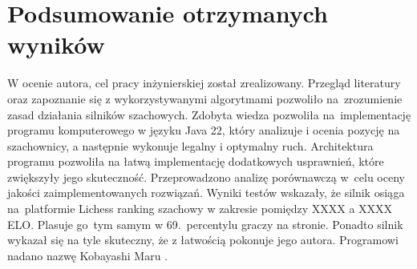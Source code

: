 \section {Podsumowanie otrzymanych wyników}
\label {sec: podsumowanie-pracy}

W ocenie autora, cel pracy inżynierskiej został zrealizowany.
Przegląd literatury oraz zapoznanie się z wykorzystywanymi algorytmami pozwoliło na~zrozumienie zasad działania silników szachowych.
Zdobyta wiedza pozwoliła na~implementację programu komputerowego w języku Java 22, który analizuje i ocenia pozycję na szachownicy, a następnie wykonuje legalny i optymalny ruch.
Architektura programu pozwoliła na łatwą implementację dodatkowych usprawnień, które zwiększyły jego skuteczność.
Przeprowadzono analizę porównawczą w~celu oceny jakości zaimplementowanych rozwiązań.
Wyniki testów wskazały, że silnik osiąga na~platformie Lichess ranking szachowy w zakresie pomiędzy XXXX a XXXX ELO.
Plasuje go~tym samym w 69.\ percentylu graczy na stronie.
Ponadto silnik wykazał się na tyle skuteczny, że z łatwością pokonuje jego autora.
Programowi nadano nazwę Kobayashi Maru \cite*{kobayashi-maru}.